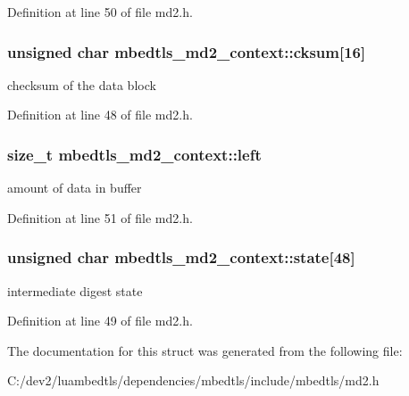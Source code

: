 Definition at line 50 of file md2.\-h.

\hypertarget{structmbedtls__md2__context_a12653607373c617159907a4b5d533c94}{
\subsubsection[{cksum}]{\setlength{\rightskip}{0pt plus 5cm}unsigned char mbedtls\-\_\-md2\-\_\-context\-::cksum\mbox{[}16\mbox{]}}}\label{structmbedtls__md2__context_a12653607373c617159907a4b5d533c94}
checksum of the data block 

Definition at line 48 of file md2.\-h.

\hypertarget{structmbedtls__md2__context_a5b070937560df586b3b20287cc6c4bbe}{
\subsubsection[{left}]{\setlength{\rightskip}{0pt plus 5cm}size\-\_\-t mbedtls\-\_\-md2\-\_\-context\-::left}}\label{structmbedtls__md2__context_a5b070937560df586b3b20287cc6c4bbe}
amount of data in buffer 

Definition at line 51 of file md2.\-h.

\hypertarget{structmbedtls__md2__context_a2849ae4cd7a078459349c046e97ae503}{
\subsubsection[{state}]{\setlength{\rightskip}{0pt plus 5cm}unsigned char mbedtls\-\_\-md2\-\_\-context\-::state\mbox{[}48\mbox{]}}}\label{structmbedtls__md2__context_a2849ae4cd7a078459349c046e97ae503}
intermediate digest state 

Definition at line 49 of file md2.\-h.



The documentation for this struct was generated from the following file\-:\begin{DoxyCompactItemize}
\item 
C\-:/dev2/luambedtls/dependencies/mbedtls/include/mbedtls/md2.\-h\end{DoxyCompactItemize}
